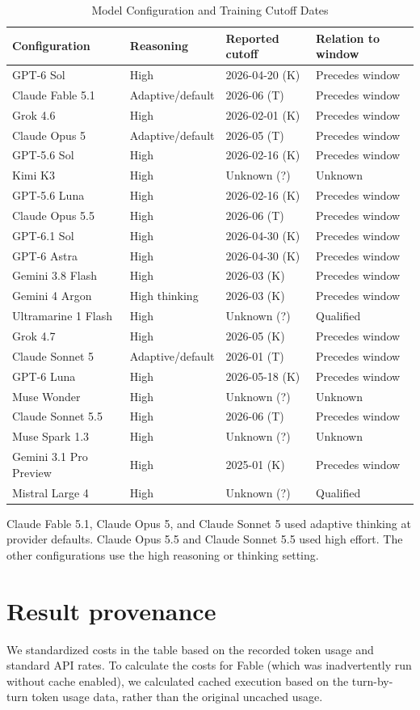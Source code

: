 \documentclass[11pt]{article}
\begin{document}
\begin{table}[ht]\centering\small\setlength{\tabcolsep}{4pt}
\begin{tabular}{llll}\toprule
Configuration & Reasoning & Reported cutoff & Relation to window\\\midrule
GPT-6 Sol & High & 2026-04-20 (K) & Precedes window \\
Claude Fable 5.1 & Adaptive/default & 2026-06 (T) & Precedes window \\
Grok 4.6 & High & 2026-02-01 (K) & Precedes window \\
Claude Opus 5 & Adaptive/default & 2026-05 (T) & Precedes window \\
GPT-5.6 Sol & High & 2026-02-16 (K) & Precedes window \\
Kimi K3 & High & Unknown (?) & Unknown \\
GPT-5.6 Luna & High & 2026-02-16 (K) & Precedes window \\
Claude Opus 5.5 & High & 2026-06 (T) & Precedes window \\
GPT-6.1 Sol & High & 2026-04-30 (K) & Precedes window \\
GPT-6 Astra & High & 2026-04-30 (K) & Precedes window \\
Gemini 3.8 Flash & High & 2026-03 (K) & Precedes window \\
Gemini 4 Argon & High thinking & 2026-03 (K) & Precedes window \\
Ultramarine 1 Flash & High & Unknown (?) & Qualified \\
Grok 4.7 & High & 2026-05 (K) & Precedes window \\
Claude Sonnet 5 & Adaptive/default & 2026-01 (T) & Precedes window \\
GPT-6 Luna & High & 2026-05-18 (K) & Precedes window \\
Muse Wonder & High & Unknown (?) & Unknown \\
Claude Sonnet 5.5 & High & 2026-06 (T) & Precedes window \\
Muse Spark 1.3 & High & Unknown (?) & Unknown \\
Gemini 3.1 Pro Preview & High & 2025-01 (K) & Precedes window \\
Mistral Large 4 & High & Unknown (?) & Qualified \\
\bottomrule\end{tabular}\caption{Model Configuration and Training Cutoff Dates}\label{tab:cutoffs}\end{table}

Claude Fable 5.1, Claude Opus 5, and Claude Sonnet 5 used adaptive thinking at provider defaults. Claude Opus 5.5 and Claude Sonnet 5.5 used high effort. The other configurations use the high reasoning or thinking setting.

\section{Result provenance}
We standardized costs in the table based on the recorded token usage and standard API rates. To calculate the costs for Fable (which was inadvertently run without cache enabled), we calculated cached execution based on the turn-by-turn token usage data, rather than the original uncached usage.
\end{document}
